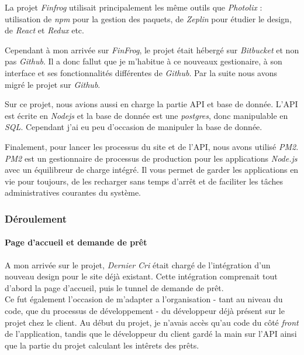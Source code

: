 \documentclass[12pt,a4paper]{article}
\begin{document}
  \bigskip

  La projet \emph{Finfrog} utilisait principalement les même outils que
  \emph{Photolix} : utilisation de \emph{npm} pour la gestion des paquets,
  de \emph{Zeplin} pour étudier le design, de \emph{React} et \emph{Redux}
  etc.

  \bigskip

  Cependant à mon arrivée sur \emph{FinFrog}, le projet était hébergé sur
  \emph{Bitbucket} et non pas \emph{Github}. Il a donc fallut que je
  m'habitue à ce nouveaux gestionaire, à son interface et ses
  fonctionnalités différentes de \emph{Github}. Par la suite nous avons
  migré le projet sur \emph{Github}.

  \bigskip

  Sur ce projet, nous avions aussi en charge la partie API et base de
  donnée. L'API est écrite en \emph{Nodejs} et la base de donnée est une
  \emph{postgres}, donc manipulable en \emph{SQL}. Cependant j'ai eu peu
  d'occasion de manipuler la base de donnée.

  \bigskip

  Finalement, pour lancer les processus du site et de l'API, nous avons
  utilisé \emph{PM2}. \emph{PM2} est un gestionnaire de processus de
  production pour les applications \emph{Node.js} avec un équilibreur de
  charge intégré. Il vous permet de garder les applications en vie pour
  toujours, de les recharger sans temps d'arrêt et de faciliter les tâches
  administratives courantes du système.

  \bigskip

  \subsubsection{Déroulement}\label{duxe9roulement-1}

  \paragraph{Page d'accueil et demande de
  prêt}\label{page-daccueil-et-demande-de-pruxeat}

  \bigskip

  A mon arrivée sur le projet, \emph{Dernier Cri} était chargé de
  l'intégration d'un nouveau design pour le site déjà existant. Cette
  intégration comprenait tout d'abord la page d'accueil, puis le tunnel de
  demande de prêt.\\
  Ce fut également l'occasion de m'adapter a l'organisation - tant au
  niveau du code, que du processus de développement - du développeur déjà
  présent sur le projet chez le client. Au début du projet, je n'avais
  accès qu'au code du côté \emph{front} de l'application, tandis que le
  développeur du client gardé la main sur l'API ainsi que la partie du
  projet calculant les intêrets des prêts.
\end{document}
